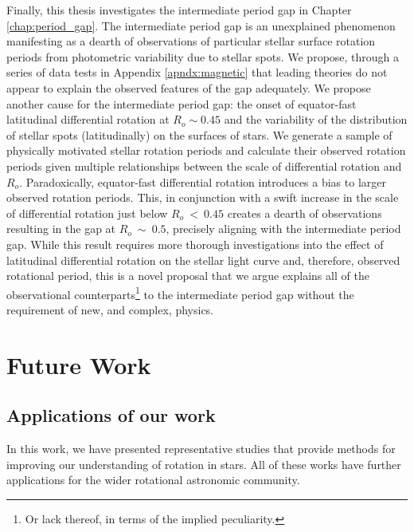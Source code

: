 Finally, this thesis investigates the intermediate period gap in Chapter \ref{chap:period_gap}.
The intermediate period gap is an unexplained phenomenon manifesting as a dearth of observations of particular stellar surface rotation periods from photometric variability due to stellar spots.
We propose, through a series of data tests in Appendix \ref{apndx:magnetic} that leading theories do not appear to explain the observed features of the gap adequately. 
We propose another cause for the intermediate period gap: the onset of equator-fast latitudinal differential rotation at $R_o \sim 0.45$ and the variability of the distribution of stellar spots (latitudinally) on the surfaces of stars.
We generate a sample of physically motivated stellar rotation periods and calculate their observed rotation periods given multiple relationships between the scale of differential rotation and $R_o$.
Paradoxically, equator-fast differential rotation introduces a bias to larger observed rotation periods.
This, in conjunction with a swift increase in the scale of differential rotation just below $R_o \ < \ 0.45$ creates a dearth of observations resulting in the gap at $R_o \ \sim \ 0.5$, precisely aligning with the intermediate period gap.
While this result requires more thorough investigations into the effect of latitudinal differential rotation on the stellar light curve and, therefore, observed rotational period, this is a novel proposal that we argue explains all of the observational counterparts\footnote{Or lack thereof, in terms of the implied peculiarity.} to the intermediate period gap without the requirement of new, and complex, physics.

\section{Future Work}

\subsection{Applications of our work}

In this work, we have presented representative studies that provide methods for improving our understanding of rotation in stars.
All of these works have further applications for the wider rotational astronomic community.

